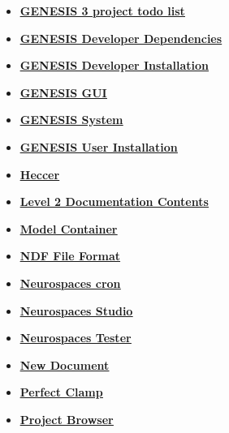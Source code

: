 \documentclass[12pt]{article}
\begin{document}
\begin{itemize}
\item \href{../project-todo/project-todo.pdf}{\bf \underline{GENESIS 3 project todo list}}

\item \href{../genesis-dependencies/genesis-dependencies.pdf}{\bf \underline{GENESIS Developer Dependencies}}

\item \href{../installation-developer/installation-developer.pdf}{\bf \underline{GENESIS Developer Installation}}

\item \href{../gui/gui.pdf}{\bf \underline{GENESIS GUI}}

\item \href{../genesis-system/genesis-system.pdf}{\bf \underline{GENESIS System}}

\item \href{../installation-user/installation-user.pdf}{\bf \underline{GENESIS User Installation}}

\item \href{../heccer/heccer.pdf}{\bf \underline{Heccer}}

\item \href{../contents-level2/contents-level2.pdf}{\bf \underline{Level 2 Documentation Contents}}

\item \href{../model-container/model-container.pdf}{\bf \underline{Model Container}}

\item \href{../ndf-file-format/ndf-file-format.pdf}{\bf \underline{NDF File Format}}

\item \href{../neurospaces-cron/neurospaces-cron.pdf}{\bf \underline{Neurospaces cron}}

\item \href{../studio/studio.pdf}{\bf \underline{Neurospaces Studio}}

\item \href{../neurospaces-tester/neurospaces-tester.pdf}{\bf \underline{Neurospaces Tester}}

\item \href{../NewDocument/NewDocument.pdf}{\bf \underline{New Document}}

\item \href{../pclamp/pclamp.pdf}{\bf \underline{Perfect Clamp}}

\item \href{../project-browser/project-browser.pdf}{\bf \underline{Project Browser}}


\end{itemize}
\end{document}
